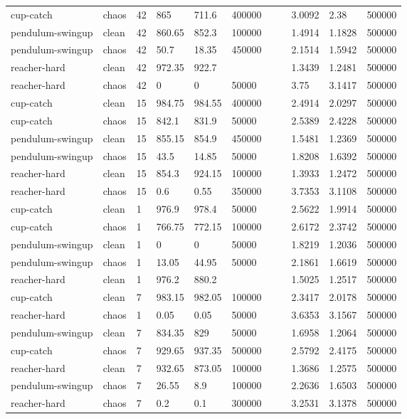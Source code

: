 \begin{tabular}{lllllllllll}
cup-catch & chaos & 42 & 865 & 711.6 & 400000 &  &  & 3.0092 & 2.38 & 500000 \\
pendulum-swingup & clean & 42 & 860.65 & 852.3 & 100000 &  &  & 1.4914 & 1.1828 & 500000 \\
pendulum-swingup & chaos & 42 & 50.7 & 18.35 & 450000 &  &  & 2.1514 & 1.5942 & 500000 \\
reacher-hard & clean & 42 & 972.35 & 922.7 &  &  &  & 1.3439 & 1.2481 & 500000 \\
reacher-hard & chaos & 42 & 0 & 0 & 50000 &  &  & 3.75 & 3.1417 & 500000 \\
cup-catch & clean & 15 & 984.75 & 984.55 & 400000 &  &  & 2.4914 & 2.0297 & 500000 \\
cup-catch & chaos & 15 & 842.1 & 831.9 & 50000 &  &  & 2.5389 & 2.4228 & 500000 \\
pendulum-swingup & clean & 15 & 855.15 & 854.9 & 450000 &  &  & 1.5481 & 1.2369 & 500000 \\
pendulum-swingup & chaos & 15 & 43.5 & 14.85 & 50000 &  &  & 1.8208 & 1.6392 & 500000 \\
reacher-hard & clean & 15 & 854.3 & 924.15 & 100000 &  &  & 1.3933 & 1.2472 & 500000 \\
reacher-hard & chaos & 15 & 0.6 & 0.55 & 350000 &  &  & 3.7353 & 3.1108 & 500000 \\
cup-catch & clean & 1 & 976.9 & 978.4 & 50000 &  &  & 2.5622 & 1.9914 & 500000 \\
cup-catch & chaos & 1 & 766.75 & 772.15 & 100000 &  &  & 2.6172 & 2.3742 & 500000 \\
pendulum-swingup & clean & 1 & 0 & 0 & 50000 &  &  & 1.8219 & 1.2036 & 500000 \\
pendulum-swingup & chaos & 1 & 13.05 & 44.95 & 50000 &  &  & 2.1861 & 1.6619 & 500000 \\
reacher-hard & clean & 1 & 976.2 & 880.2 &  &  &  & 1.5025 & 1.2517 & 500000 \\
cup-catch & clean & 7 & 983.15 & 982.05 & 100000 &  &  & 2.3417 & 2.0178 & 500000 \\
reacher-hard & chaos & 1 & 0.05 & 0.05 & 50000 &  &  & 3.6353 & 3.1567 & 500000 \\
pendulum-swingup & clean & 7 & 834.35 & 829 & 50000 &  &  & 1.6958 & 1.2064 & 500000 \\
cup-catch & chaos & 7 & 929.65 & 937.35 & 500000 &  &  & 2.5792 & 2.4175 & 500000 \\
reacher-hard & clean & 7 & 932.65 & 873.05 & 100000 &  &  & 1.3686 & 1.2575 & 500000 \\
pendulum-swingup & chaos & 7 & 26.55 & 8.9 & 100000 &  &  & 2.2636 & 1.6503 & 500000 \\
reacher-hard & chaos & 7 & 0.2 & 0.1 & 300000 &  &  & 3.2531 & 3.1378 & 500000 \\
\bottomrule
\end{tabular}
